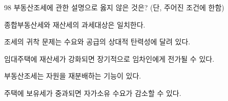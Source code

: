 \begin{question}{98}
부동산조세에 관한 설명으로 옳지 않은 것은? (단, 주어진 조건에 한함)
\begin{choices}
  \item 종합부동산세와 재산세의 과세대상은 일치한다.
  \item 조세의 귀착 문제는 수요와 공급의 상대적 탄력성에 달려 있다.
  \item 임대주택에 재산세가 강화되면 장기적으로 임차인에게 전가될 수 있다.
  \item 부동산조세는 자원을 재분배하는 기능이 있다.
  \item 주택에 보유세가 중과되면 자가소유 수요가 감소할 수 있다.
\end{choices}
\end{question}
